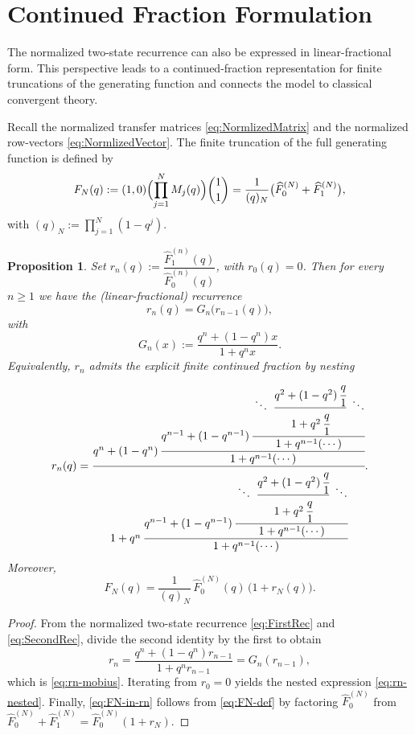 \documentclass[letterpaper,12pt]{article}
\newtheorem{proposition}{Proposition}
\begin{document}
 


\section{Continued Fraction Formulation}\label{sec:ContinuerFraction}
The normalized two-state recurrence can also be expressed in linear-fractional form. 
This perspective leads to a continued-fraction representation for finite truncations of the generating function and connects the model to classical convergent theory.


Recall the normalized transfer matrices \eqref{eq:NormlizedMatrix} and   the normalized row-vectors \eqref{eq:NormlizedVector}. The finite truncation of the full generating function is defined by
\begin{equation}\label{eq:FN-def}
F_N(q):=(1,0)\Bigl(\prod_{j=1}^N M_j(q)\Bigr)\binom11
=\frac{1}{(q)_N}\bigl(\widehat F^{(N)}_0+\widehat F^{(N)}_1\bigr),
\end{equation}
with $(q)_N:=\prod_{j=1}^N(1-q^j)$.
\begin{proposition}\label{prop:mobius-cf}
Set $r_n(q):=\dfrac{\widehat F^{(n)}_1(q)}{\widehat F^{(n)}_0(q)}$, with $r_0(q)=0$. 
Then for every $n\ge 1$ we have the   (linear-fractional) recurrence
\begin{equation}\label{eq:rn-mobius}
r_n(q)=G_n\bigl(r_{n-1}(q)\bigr),
\end{equation}
with 
\begin{equation}
    G_n(x):=\frac{q^n+(1-q^n)x}{1+q^n x}.
\end{equation}
Equivalently, $r_n$ admits the explicit finite continued fraction by nesting
\begin{equation}\label{eq:rn-nested}
r_n(q)=
\cfrac{q^n+(1-q^n)\,\cfrac{q^{n-1}+(1-q^{n-1})\,\cfrac{\ddots\ \cfrac{q^2+(1-q^2)\,\cfrac{q}{1}}{1+q^2\,\cfrac{q}{1}}\ \ddots}{1+q^{n-1}(\cdots)}}{1+q^{n-1}(\cdots)}}
{1+q^n\,\cfrac{q^{n-1}+(1-q^{n-1})\,\cfrac{\ddots\ \cfrac{q^2+(1-q^2)\,\cfrac{q}{1}}{1+q^2\,\cfrac{q}{1}}\ \ddots}{1+q^{n-1}(\cdots)}}{1+q^{n-1}(\cdots)}}.
\end{equation}
Moreover,
\begin{equation}\label{eq:FN-in-rn}
F_N(q)=\frac{1}{(q)_N}\,\widehat F^{(N)}_0(q)\,\bigl(1+r_N(q)\bigr).
\end{equation}
\end{proposition}
\begin{proof}
From the normalized two-state recurrence \eqref{eq:FirstRec} and \eqref{eq:SecondRec}, divide the second identity by the first to obtain
\[
r_n=\frac{q^n+(1-q^n)r_{n-1}}{1+q^n r_{n-1}}=G_n(r_{n-1}),
\]
which is \eqref{eq:rn-mobius}. Iterating from $r_0=0$ yields the nested expression
\eqref{eq:rn-nested}. Finally, \eqref{eq:FN-in-rn} follows from
\eqref{eq:FN-def} by factoring $\widehat F^{(N)}_0$ from
$\widehat F^{(N)}_0+\widehat F^{(N)}_1=\widehat F^{(N)}_0(1+r_N)$.
\end{proof}
\end{document}
